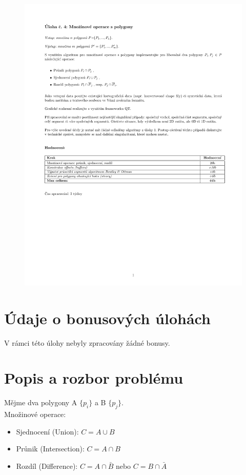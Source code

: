 \documentclass[a4paper, 12pt]{article}
\begin{document}
\begin{figure}[h!]
	\includegraphics[clip, trim=0cm 4cm 0cm 3cm, width=1.0\textwidth]{zadani.pdf}
\end{figure}


\section{Údaje o bonusových úlohách}

V rámci této úlohy nebyly zpracovány žádné bonusy.



\clearpage

\section{Popis a rozbor problému}
Mějme dva polygony A $\{p_i\}$ a B $\{p_j\}$.\\

Množinové operace:
\begin{itemize}
\item Sjednocení (Union): $C = A \cup B$
\item Průnik (Intersection): $C = A \cap B$
\item Rozdíl (Difference): $C = A \cap \bar{B}$ nebo $C = B \cap \bar{A}$
\end{itemize}
\end{document}
